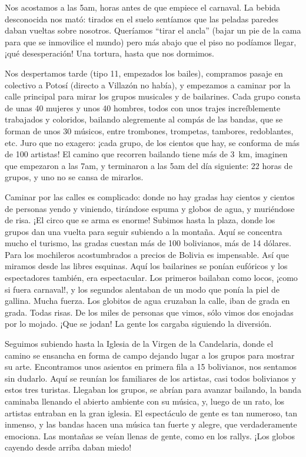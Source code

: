 Nos acostamos a las 5am, horas antes de que empiece el carnaval. La bebida
desconocida nos mató: tirados en el suelo sentíamos que las peladas paredes
daban vueltas sobre nosotros. Queríamos ``tirar el ancla'' (bajar un pie de la
cama para que se inmovilice el mundo) pero más abajo que el piso no podíamos
llegar, ¡qué desesperación! Una tortura, hasta que nos dormimos.

Nos despertamos tarde (tipo 11, empezados los bailes), compramos pasaje en
colectivo a Potosí (directo a Villazón no había), y empezamos a caminar por la
calle principal para mirar los grupos musicales y de bailarines. Cada grupo
consta de unas 40 mujeres y unos 40 hombres, todos con unos trajes
increíblemente trabajados y coloridos, bailando alegremente al compás de las
bandas, que se forman de unos 30 músicos, entre trombones, trompetas, tambores,
redoblantes, etc. Juro que no exagero: ¡cada grupo, de los cientos que hay, se
conforma de más de 100 artistas! El camino que recorren bailando tiene más de
3~km, imaginen que empezaron a las 7am, y terminaron a las 5am del día
siguiente: 22 horas de grupos, y uno no se cansa de mirarlos.

Caminar por las calles es complicado: donde no hay gradas hay cientos y cientos
de personas yendo y viniendo, tirándose espuma y globos de agua, y muriéndose de
risa. ¡El circo que se arma es enorme! Subimos hasta la plaza, donde los grupos
dan una vuelta para seguir subiendo a la montaña. Aquí se concentra mucho el
turismo, las gradas cuestan más de 100 bolivianos, más de 14 dólares. Para los
mochileros acostumbrados a precios de Bolivia es impensable. Así que miramos
desde las libres esquinas. Aquí los bailarines se ponían eufóricos y los
espectadores también, era espectacular. Los primeros bailaban como locos, ¡como
si fuera carnaval!, y los segundos alentaban de un modo que ponía la piel de
gallina. Mucha fuerza. Los globitos de agua cruzaban la calle, iban de grada en
grada. Todas risas. De los miles de personas que vimos, sólo vimos dos enojadas
por lo mojado. ¡Que se jodan! La gente los cargaba siguiendo la diversión.

Seguimos subiendo hasta la Iglesia de la Virgen de la Candelaria, donde el
camino se ensancha en forma de campo dejando lugar a los grupos para mostrar su
arte. Encontramos unos asientos en primera fila a 15 bolivianos, nos sentamos
sin dudarlo. Aquí se reunían los familiares de los artistas, casi todos
bolivianos y estos tres turistas. Llegaban los grupos, se abrían para avanzar
bailando, la banda caminaba llenando el abierto ambiente con su música, y, luego
de un rato, los artistas entraban en la gran iglesia. El espectáculo de gente es
tan numeroso, tan inmenso, y las bandas hacen una música tan fuerte y alegre,
que verdaderamente emociona. Las montañas se veían llenas de gente, como en los
rallys. ¡Los globos cayendo desde arriba daban miedo!

